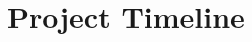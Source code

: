 \documentclass[11pt,parskip=full+]{scrartcl}
\begin{document}
\section*{Project Timeline}
\vspace*{-1em}
\end{document}
